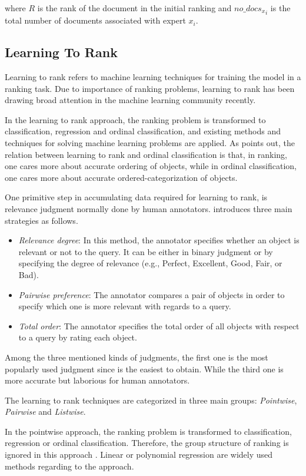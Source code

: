 \noindent 
where $R$ is the rank of the document in the initial ranking and ${no\_docs_x}_i$ is the total number of documents associated with expert $x_i$.

\subsection{Learning To Rank}
Learning to rank refers to machine learning techniques for training the model in a ranking task. Due to importance of ranking problems, learning to rank has been drawing broad attention in the machine learning community recently. 

In the learning to rank approach, the ranking problem is transformed to classification, regression and ordinal classification, and existing methods and techniques for solving machine learning problems are applied. As \cite{l2r-intro} points out, the relation between learning to rank and ordinal classification is that, in ranking, one cares more about accurate ordering of objects, while in ordinal classification, one cares more about accurate ordered-categorization of objects.

One primitive step in accumulating data required for learning to rank, is relevance judgment normally done by human annotators. \cite{l2r-book} introduces three main strategies as follows.
\begin{itemize}
\item \textit{Relevance degree}: In this method, the annotator specifies whether an object is relevant or not to the query. It can be either in binary judgment or by specifying the degree of relevance (e.g., Perfect, Excellent, Good, Fair, or Bad).
\item \textit{Pairwise preference}: The annotator compares a pair of objects in order to specify which one is more relevant with regards to a query.
\item \textit{Total order}: The annotator specifies the total order of all objects with respect to a query by rating each object.
\end{itemize}

Among the three mentioned kinds of judgments, the first one is the most popularly used judgment since is the easiest to obtain. While the third one is more accurate but laborious for human annotators.

The learning to rank techniques are categorized in three main groups: \textit{Pointwise}, \textit{Pairwise} and \textit{Listwise}.

In the pointwise approach, the ranking problem is transformed to classification, regression or ordinal classification. Therefore, the group structure of ranking is ignored in this approach \cite{l2r-intro}. Linear or polynomial regression are widely used methods regarding to the approach.

